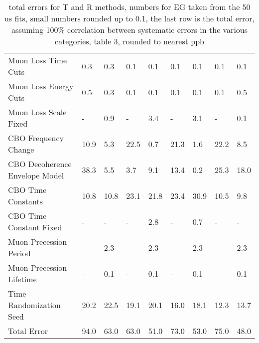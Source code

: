 \begin{landscape}
\begin{table}
\begin{tabular*}{0.8\linewidth}{@{\extracolsep{\fill}}lHHHHHHHH}
    Muon Loss Time Cuts      &  0.3  &  0.3 &  0.1 &  0.1 &  0.1 &  0.1 &  0.1 &  0.1 \\
    Muon Loss Energy Cuts    &  0.5  &  0.3 &  0.1 &  0.1 &  0.1 &  0.1 &  0.1 &  0.5 \\
    Muon Loss Scale Fixed    &  -	   &  0.9 &  -	 &  3.4 &  -   &  3.1 &  -	 &  0.1 \\
  \hdashline
    CBO Frequency Change      		   &  10.9 &  5.3 & 22.5 &  0.7 & 21.3 &  1.6 & 22.2 &  8.5 \\
    CBO Decoherence Envelope Model   &  38.3 &  5.5 &  3.7 &  9.1 & 13.4 &  0.2 & 25.3 & 18.0 \\
    CBO Time Constants      		     &  10.8 & 10.8 & 23.1 & 21.8 & 23.4 & 30.9 & 10.5 &  9.8 \\
    CBO Time Constant Fixed      	   &  -    & -    & -	 &  2.8 & -	   &  0.7 & -	 & - \\
  \hdashline
    Muon Precession Period      	   &  -	   &  2.3 & -	 & 2.3  & -	   &  2.3 & -	 &  2.3 \\
    Muon Precession Lifetime      	 &  -	   &  0.1 & -	 & 0.1  & -	   &  0.1 & -	 &  0.1 \\
  \hdashline
    Time Randomization Seed      	   &  20.2 & 22.5 & 19.1 & 20.1 & 16.0 & 18.1 & 12.3 & 13.7 \\
  \hline
    Total Error & 94.0 & 63.0 & 63.0 & 51.0 & 73.0 & 53.0 & 75.0 & 48.0 \\
  \hline 
\end{tabular*}
\caption[]{total errors \cite{CombinationNote} for T and R methods, numbers for EG taken from the 50 us fits, small numbers rounded up to 0.1, the last row is the total error, assuming 100\% correlation between systematic errors in the various categories, \cite{CombinationNote} table 3, rounded to nearest ppb}
\label{tab:totalErrs}
\end{table}
\end{landscape}



